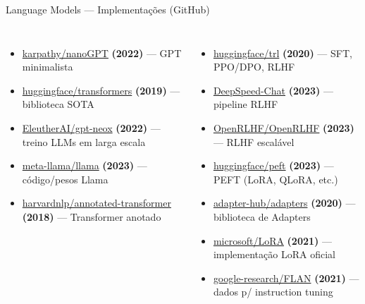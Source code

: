 \documentclass{beamer}
\begin{document}
\begin{frame}{Language Models — Implementações (GitHub)}
\scriptsize
\begin{columns}[t]
  \begin{itemize}
    \item \href{https://github.com/karpathy/nanoGPT}{karpathy/nanoGPT} \textbf{(2022)} — GPT minimalista
    \item \href{https://github.com/huggingface/transformers}{huggingface/transformers} \textbf{(2019)} — biblioteca SOTA
    \item \href{https://github.com/EleutherAI/gpt-neox}{EleutherAI/gpt-neox} \textbf{(2022)} — treino LLMs em larga escala
    \item \href{https://github.com/meta-llama/llama}{meta-llama/llama} \textbf{(2023)} — código/pesos Llama
    \item \href{https://github.com/harvardnlp/annotated-transformer}{harvardnlp/annotated-transformer} \textbf{(2018)} — Transformer anotado
  \end{itemize}

  \begin{itemize}
    \item \href{https://github.com/huggingface/trl}{huggingface/trl} \textbf{(2020)} — SFT, PPO/DPO, RLHF
    \item \href{https://github.com/deepspeedai/DeepSpeedExamples/tree/master/applications/DeepSpeed-Chat}{DeepSpeed-Chat} \textbf{(2023)} — pipeline RLHF
    \item \href{https://github.com/OpenRLHF/OpenRLHF}{OpenRLHF/OpenRLHF} \textbf{(2023)} — RLHF escalável
    \item \href{https://github.com/huggingface/peft}{huggingface/peft} \textbf{(2023)} — PEFT (LoRA, QLoRA, etc.)
    \item \href{https://github.com/adapter-hub/adapters}{adapter-hub/adapters} \textbf{(2020)} — biblioteca de Adapters
    \item \href{https://github.com/microsoft/LoRA}{microsoft/LoRA} \textbf{(2021)} — implementação LoRA oficial
    \item \href{https://github.com/google-research/FLAN}{google-research/FLAN} \textbf{(2021)} — dados p/ instruction tuning
  \end{itemize}
\end{columns}
\end{frame}

\end{document}
